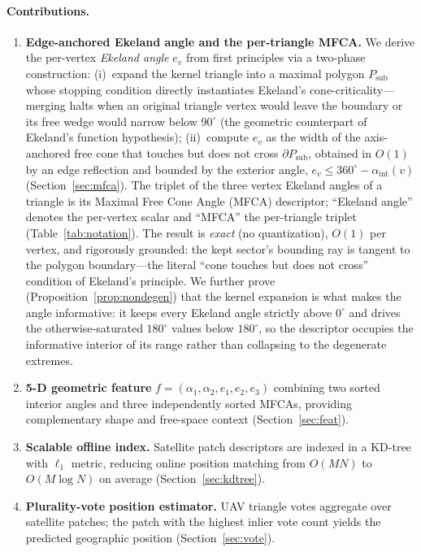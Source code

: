 \documentclass[10pt]{article}
\theoremstyle{plain}
\theoremstyle{definition}
\begin{document}
\paragraph{Contributions.}
\begin{enumerate}
\item \textbf{Edge-anchored Ekeland angle and the per-triangle MFCA.}
      We derive the per-vertex \emph{Ekeland angle} $e_v$ from first principles
      via a two-phase construction: (i)~expand the kernel triangle into a
      maximal polygon $P_{\mathrm{sub}}$ whose stopping condition directly
      instantiates Ekeland's cone-criticality---merging halts when an original
      triangle vertex would leave the boundary or its free wedge would narrow
      below $90^\circ$ (the geometric counterpart of Ekeland's function
      hypothesis); (ii)~compute $e_v$ as the width of the axis-anchored free cone
      that touches but does not cross $\partial P_{\mathrm{sub}}$, obtained in
      $O(1)$ by an edge reflection and bounded by the exterior angle,
      $e_v\le 360^\circ-\alpha_{\mathrm{int}}(v)$ (Section~\ref{sec:mfca}).
      The triplet of the three vertex
      Ekeland angles of a triangle is its Maximal Free Cone Angle (MFCA)
      descriptor; ``Ekeland angle'' denotes the per-vertex scalar and ``MFCA''
      the per-triangle triplet (Table~\ref{tab:notation}).
      The result is \emph{exact} (no quantization), $O(1)$ per vertex, and
      rigorously grounded: the kept sector's bounding ray is tangent to the
      polygon boundary---the literal ``cone touches but does not cross''
      condition of Ekeland's principle.
      We further prove (Proposition~\ref{prop:nondegen}) that the kernel
      expansion is what makes the angle informative: it keeps every Ekeland
      angle strictly above $0^\circ$ and drives the otherwise-saturated
      $180^\circ$ values below $180^\circ$, so the descriptor occupies the
      informative interior of its range rather than collapsing to the
      degenerate extremes.
\item \textbf{5-D geometric feature}
      $f = (\alpha_1,\alpha_2,e_1,e_2,e_3)$ combining two sorted interior
      angles and three independently sorted MFCAs, providing complementary
      shape and free-space context (Section~\ref{sec:feat}).
\item \textbf{Scalable offline index.}
      Satellite patch descriptors are indexed in a KD-tree with $\ell_1$ metric,
      reducing online position matching from $O(MN)$ to $O(M\log N)$ on average
      (Section~\ref{sec:kdtree}).
\item \textbf{Plurality-vote position estimator.}
      UAV triangle votes aggregate over satellite patches; the patch with the
      highest inlier vote count yields the predicted geographic position
      (Section~\ref{sec:vote}).
\end{enumerate}
\end{document}
